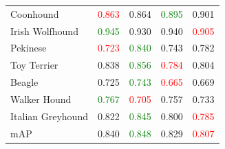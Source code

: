 \documentclass[a4paper,12pt,oneside]{article}
\begin{document}
\begin{table}
\begin{tabular}{|l|c|c|c|c|}
Coonhound & \textcolor{red}{0.863} & 0.864 & \textcolor{green}{0.895} & 0.901\\
Irish Wolfhound & \textcolor{green}{0.945} & 0.930 & 0.940 & \textcolor{red}{0.905}\\
Pekinese & \textcolor{red}{0.723} & \textcolor{green}{0.840} & 0.743 & 0.782\\
Toy Terrier & 0.838 & \textcolor{green}{0.856} & \textcolor{red}{0.784} & 0.804\\
Beagle & 0.725 & \textcolor{green}{0.743} & \textcolor{red}{0.665} & 0.669\\
Walker Hound & \textcolor{green}{0.767} & \textcolor{red}{0.705} & 0.757 & 0.733\\
Italian Greyhound & 0.822 & \textcolor{green}{0.845} & 0.800 & \textcolor{red}{0.785}\\
\hline
mAP & 0.840 & \textcolor{green}{0.848} & 0.829 & \textcolor{red}{0.807}\\
\hline
\end{tabular}
\end{table}
\end{document}
